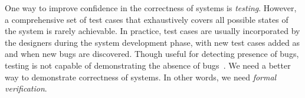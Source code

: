 %

One way to improve confidence in the correctness of systems is
\emph{testing}.
However, a comprehensive set of test cases that exhaustively covers
all possible states of the system is rarely achievable.
In practice, test cases are usually incorporated by the designers
during the system development phase, with new test cases added as and
when new bugs are discovered.
Though useful for detecting presence of bugs, testing is not capable
of demonstrating the absence of bugs~\cite{DijkstraTesting}.
We need a better way to demonstrate correctness of systems.
In other words, we need \emph{formal verification}.
   
